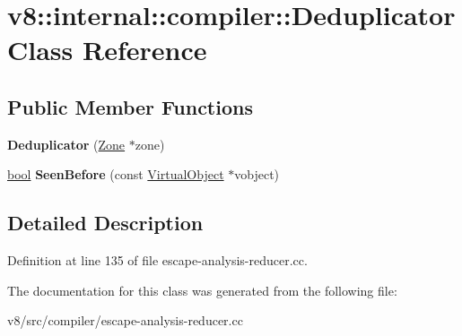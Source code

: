 \hypertarget{classv8_1_1internal_1_1compiler_1_1Deduplicator}{}\section{v8\+:\+:internal\+:\+:compiler\+:\+:Deduplicator Class Reference}
\label{classv8_1_1internal_1_1compiler_1_1Deduplicator}
\subsection*{Public Member Functions}
\begin{DoxyCompactItemize}
\item 
\mbox{\label{classv8_1_1internal_1_1compiler_1_1Deduplicator_a1fa69019ef9740aac0612f33c2449be2}} 
{\bfseries Deduplicator} (\mbox{\hyperlink{classv8_1_1internal_1_1Zone}{Zone}} $\ast$zone)
\item 
\mbox{\label{classv8_1_1internal_1_1compiler_1_1Deduplicator_a060b94a77a86292e9a5bb655b497f9b7}} 
\mbox{\hyperlink{classbool}{bool}} {\bfseries Seen\+Before} (const \mbox{\hyperlink{classv8_1_1internal_1_1compiler_1_1VirtualObject}{Virtual\+Object}} $\ast$vobject)
\end{DoxyCompactItemize}


\subsection{Detailed Description}


Definition at line 135 of file escape-\/analysis-\/reducer.\+cc.



The documentation for this class was generated from the following file\+:\begin{DoxyCompactItemize}
\item 
v8/src/compiler/escape-\/analysis-\/reducer.\+cc\end{DoxyCompactItemize}
